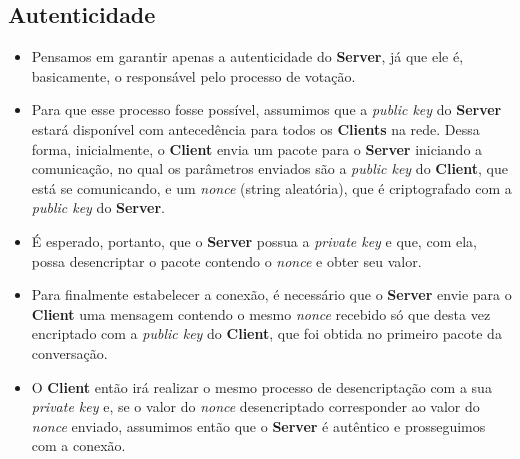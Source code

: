 \documentclass[10pt]{article}
\begin{document}
    \subsection{Autenticidade}
    \begin{itemize}
    \item Pensamos em garantir apenas a autenticidade do \textbf{Server}, já que ele é, basicamente, o responsável pelo processo de votação.
    \item Para que esse processo fosse possível, assumimos que a \textit{public key} do \textbf{Server} estará disponível com antecedência para todos os \textbf{Clients} na rede. Dessa forma, inicialmente, o \textbf{Client} envia um pacote para o \textbf{Server} iniciando a comunicação, no qual os parâmetros enviados são a \textit{public key} do \textbf{Client}, que está se comunicando, e um \textit{nonce} (string aleatória), que é criptografado com a \textit{public key} do \textbf{Server}.
    \item É esperado, portanto, que o \textbf{Server} possua a \textit{private key} e que, com ela, possa desencriptar o pacote contendo o \textit{nonce} e obter seu valor.
    \item Para finalmente estabelecer a conexão, é necessário que o \textbf{Server} envie para o \textbf{Client} uma mensagem contendo o mesmo \textit{nonce} recebido só que desta vez encriptado com a \textit{public key} do \textbf{Client}, que foi obtida no primeiro pacote da conversação.
    \item O \textbf{Client} então irá realizar o mesmo processo de desencriptação com a sua \textit{private key} e, se o valor do \textit{nonce} desencriptado corresponder ao valor do \textit{nonce} enviado, assumimos então que o \textbf{Server} é autêntico e prosseguimos com a conexão.
    \end{itemize}
    
\end{document}
